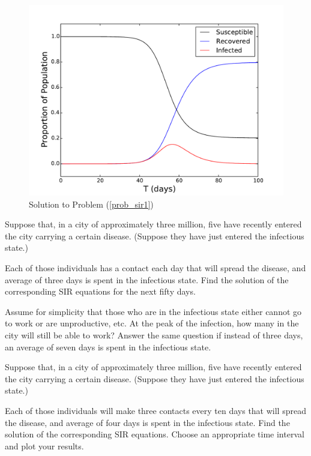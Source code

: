 \begin{figure}[ht]
\centering
\includegraphics[width=\textwidth]{SIR1.pdf}
\caption{Solution to Problem (\ref{prob_sir1}) }
\label{sir1}
\end{figure}

\begin{problem}
Suppose that, in a city of approximately three million, five have recently entered the city carrying a certain disease. (Suppose they have just entered the infectious state.)

Each of those individuals has a contact each day that will spread the disease, and average of three days is spent in the infectious state. Find the solution of the corresponding SIR equations for the next fifty days. 

Assume for simplicity that those who are in the infectious state either cannot go to work or are unproductive, etc. At the peak of the infection, how many in the city will still be able to work? 
Answer the same question if instead of three days, an average of seven days is spent in the infectious state.
\end{problem}


\begin{problem}
Suppose that, in a city of approximately three million, five have recently entered the city carrying a certain disease. (Suppose they have just entered the infectious state.) 

Each of those individuals will make three contacts every ten days that will spread the disease, and average of four days is spent in the infectious state. Find the solution of the corresponding SIR equations. Choose an appropriate time interval and plot your results.
\end{problem}


